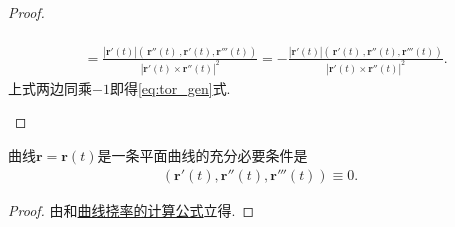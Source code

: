 \documentclass[../../main.tex]{subfiles}%
\begin{document}
\begin{proof}
\begin{enumerate}
\begin{align*}
\\
&=\frac{\left| \boldsymbol{r}' \left( t \right) \right|\left( \,\boldsymbol{r}'' \left( t \right) \,,\boldsymbol{r}' \left( t \right) ,\boldsymbol{r}''' \left( t \right) \right)}{\left| \boldsymbol{r}' \left( t \right) \times \boldsymbol{r}'' \left( t \right) \right|^2}=-\frac{\left| \boldsymbol{r}' \left( t \right) \right|\left( \,\boldsymbol{r}' \left( t \right) \,,\boldsymbol{r}'' \left( t \right) ,\boldsymbol{r}''' \left( t \right) \right)}{\left| \boldsymbol{r}' \left( t \right) \times \boldsymbol{r}'' \left( t \right) \right|^2}.
\end{align*}
上式两边同乘$-1$即得\eqref{eq:tor_gen}式.
\end{enumerate}

\end{proof}

\begin{theorem}
曲线$\bm{r} = \bm{r}(t)$是一条平面曲线的充分必要条件是
\begin{align*}
(\bm{r}'(t), \bm{r}''(t), \bm{r}'''(t)) \equiv 0.
\end{align*}
\end{theorem}
\begin{proof}

由和\hyperref[theorem:微分几何-曲线挠率的计算公式]{曲线挠率的计算公式}立得.

\end{proof}
\end{document}
